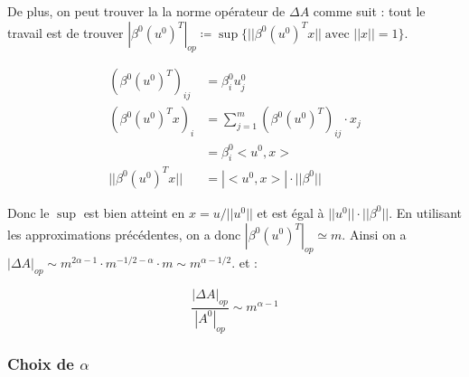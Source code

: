 \documentclass[a4paper, 11pt, french]{article}
\theoremstyle{definition}
\begin{document}
	De plus, on peut trouver la la norme opérateur de $\Delta A$ comme suit : tout le travail est de trouver $|\beta^0 (u^0)^T|_{op} \coloneqq \sup \{||\beta^0 (u^0)^T x|| \; 
	\text{avec }||x|| = 1\}$.
	
	\begin{align}
		(\beta^0 (u^0)^T)_{ij} &= \beta^0_i u^0_j \\
		(\beta^0 (u^0)^T x)_i &= \sum_{j=1}^{m} (\beta^0 (u^0)^T)_{ij} \cdot x_j \\
		&= \beta^0_i < u^0, x> \\
		||\beta^0 (u^0)^T x|| &= |< u^0, x>| \cdot ||\beta^0||
	\end{align}

	Donc le $\sup$ est bien atteint en $x = u / ||u^0||$ et est égal à $||u^0|| \cdot ||\beta^0||$. En utilisant les approximations précédentes, on a donc $|\beta^0 (u^0)^T|_{op} \simeq m$. Ainsi on a $|\Delta A|_{op} \sim m^{2\alpha - 1} \cdot m^{-1/2 - \alpha} \cdot m \sim m^{\alpha - 1/2}.$ et :
	
	\[\frac{|\Delta A|_{op}}{|A^0|_{op}} \sim m^{\alpha - 1}\]
	
	\subsubsection{Choix de $\alpha$}
	
\end{document}
